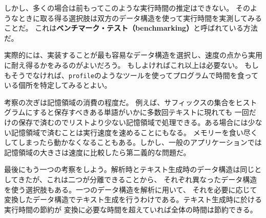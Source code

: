 \documentclass[a4j,12pt,makeidx]{jbook}
\begin{document}
しかし、多くの場合は前もってこのような実行時間の推定はできない。
そのようなときに取る得る選択肢は双方のデータ構造を使って実行時間を実測してみることだ。
これは{\bf ベンチマーク・テスト（benchmarking）}と呼ばれている方法だ。\par
実際的には、実装することが最も容易なデータ構造を選択し、速度の点から実用に耐え得るかをみるのがよいだろう。
もしよければこれ以上は必要ない。
もしもそうでなければ、{\tt profile}のようなツールを使ってプログラムで時間を食っている個所を特定してみるとよい。\par
考察の次ぎは記憶領域の消費の程度だ。
例えば、サフィックスの集合をヒストグラムにすると保存すべきある単語がいかに多数回テキストに現れても
一回だけの保存で済むのでリストより少ない記憶領域で処理できる。ある場合には少ない記憶領域で済むことは実行速度を速めることにもなる。
メモリーを食い尽くしてしまったら動かなくなることもある。しかし、一般のアプリケーションでは記憶領域の大きさは速度に比較したら第二義的な問題だ。\par
最後にもう一つの考察をしよう。解析時とテキスト生成時のデータ構造は同じとしてきたが、これは二つが分離できることから、
それぞれ異なったデータ構造を使う選択肢もある。一つのデータ構造を解析に用いて、
それを必要に応じて変換したデータ構造でテキスト生成を行うわけである。テキスト生成時に於ける実行時間の節約が
変換に必要な時間を超えていれば全体の時間は節約できる。
%
\end{document}
